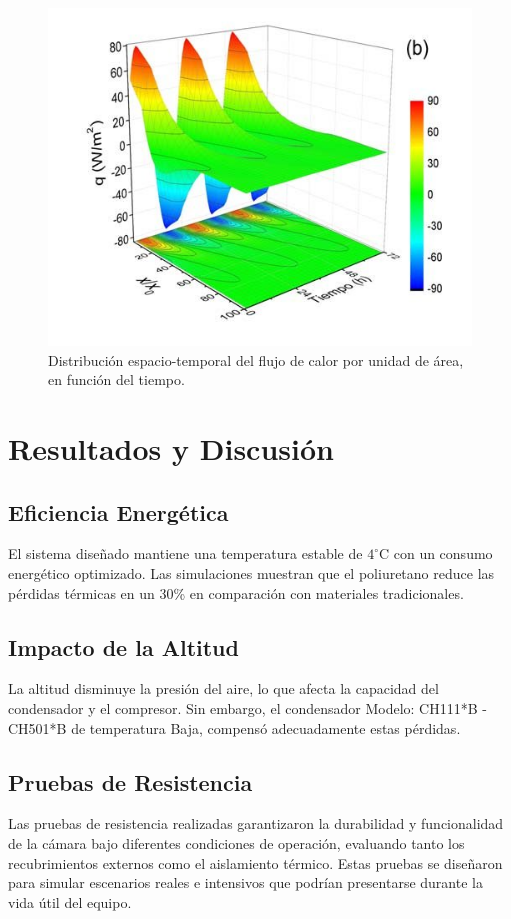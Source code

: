 \documentclass{article}
\begin{document}
\begin{multicols}{2}
 	\begin{figure}[H]
		\centering
		\includegraphics[width=\linewidth]{figures/temp-simulation}
		\caption{Distribución espacio-temporal del flujo de calor por unidad de área, en función del tiempo.}
		\label{fig:temp-simulation}
	\end{figure}
	
	
	\section{Resultados y Discusión}
	\subsection{Eficiencia Energética}
	El sistema diseñado mantiene una temperatura estable de $4^\circ$C con un consumo energético optimizado. Las simulaciones muestran que el poliuretano reduce las pérdidas térmicas en un 30\% en comparación con materiales tradicionales.
	
	\subsection{Impacto de la Altitud}
	La altitud disminuye la presión del aire, lo que afecta la capacidad del condensador y el compresor. Sin embargo, el condensador Modelo: CH111*B - CH501*B de temperatura Baja,  compensó adecuadamente estas pérdidas. \cite{bohn}
	
\subsection{Pruebas de Resistencia}
Las pruebas de resistencia realizadas garantizaron la durabilidad y funcionalidad de la cámara bajo diferentes condiciones de operación, evaluando tanto los recubrimientos externos como el aislamiento térmico. Estas pruebas se diseñaron para simular escenarios reales e intensivos que podrían presentarse durante la vida útil del equipo.


\end{multicols}
\end{document}
